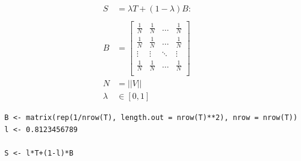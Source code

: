 \documentclass[11pt]{article}
\begin{document}
\begin{align}
    S &= \lambda T +  \left( 1- \lambda \right)B :\\
\ \\
    B&= \begin{bmatrix}
    \frac{1}{N} & \frac{1}{N} & \ldots & \frac{1}{N} \\
    \frac{1}{N} & \frac{1}{N} & \ldots & \frac{1}{N} \\
        \vdots      & \vdots      & \ddots & \vdots \\
    \frac{1}{N} & \frac{1}{N} & \ldots & \frac{1}{N} \\
    \end{bmatrix}  \\
    N&= \left| \left| V \right| \right| \\
    \lambda &\in [0,1]
\end{align}

\lstset{language=r,label= ,caption= ,captionpos=b,numbers=none}
\begin{lstlisting}
  B <- matrix(rep(1/nrow(T), length.out = nrow(T)**2), nrow = nrow(T))
  l <- 0.8123456789

  S <- l*T+(1-l)*B
\end{lstlisting}
\end{document}
